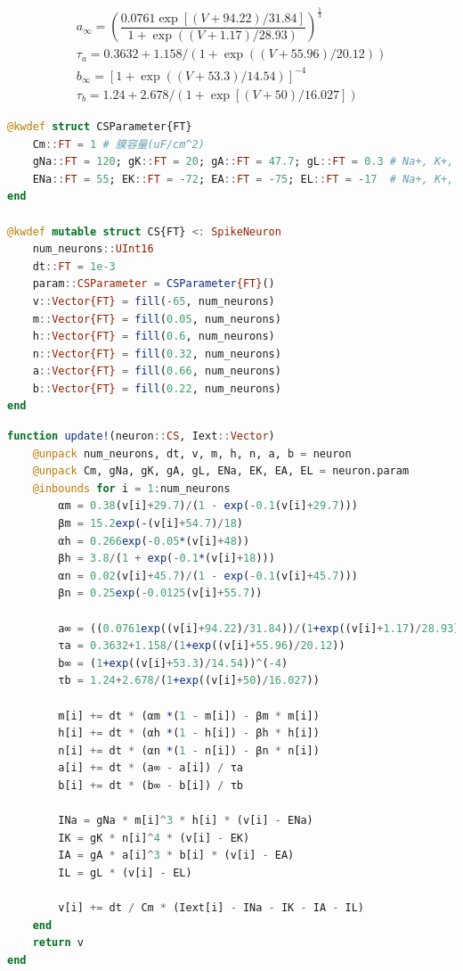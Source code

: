 \begin{equation}
\begin{array}{l}
a_{\infty}=\left(\dfrac{0.0761 \exp [(V+94.22)/31.84]}{1+\exp ((V+1.17)/28.93)}\right)^{\frac{1}{3}}\\
\tau_a=0.3632+1.158 /(1+\exp ((V+55.96)/20.12)) \\
b_{\infty}=\left[1+\exp ((V+53.3)/14.54)\right]^{-4}\\
\tau_b=1.24+2.678 /(1+\exp [(V+50)/16.027])
\end{array}
\end{equation}
\begin{lstlisting}[language=julia]
@kwdef struct CSParameter{FT}
    Cm::FT = 1 # 膜容量(uF/cm^2)
    gNa::FT = 120; gK::FT = 20; gA::FT = 47.7; gL::FT = 0.3 # Na+, K+, KA, leakの最大コンダクタンス(mS/cm^2)
    ENa::FT = 55; EK::FT = -72; EA::FT = -75; EL::FT = -17  # Na+, K+, KA, leakの平衡電位(mV)
end

@kwdef mutable struct CS{FT} <: SpikeNeuron
    num_neurons::UInt16
    dt::FT = 1e-3
    param::CSParameter = CSParameter{FT}()
    v::Vector{FT} = fill(-65, num_neurons)
    m::Vector{FT} = fill(0.05, num_neurons) 
    h::Vector{FT} = fill(0.6, num_neurons)
    n::Vector{FT} = fill(0.32, num_neurons)
    a::Vector{FT} = fill(0.66, num_neurons)
    b::Vector{FT} = fill(0.22, num_neurons)
end
\end{lstlisting}
\begin{lstlisting}[language=julia]
function update!(neuron::CS, Iext::Vector)
    @unpack num_neurons, dt, v, m, h, n, a, b = neuron
    @unpack Cm, gNa, gK, gA, gL, ENa, EK, EA, EL = neuron.param
    @inbounds for i = 1:num_neurons
        αm = 0.38(v[i]+29.7)/(1 - exp(-0.1(v[i]+29.7)))
        βm = 15.2exp(-(v[i]+54.7)/18)
        αh = 0.266exp(-0.05*(v[i]+48))
        βh = 3.8/(1 + exp(-0.1*(v[i]+18)))
        αn = 0.02(v[i]+45.7)/(1 - exp(-0.1(v[i]+45.7)))
        βn = 0.25exp(-0.0125(v[i]+55.7))
        
        a∞ = ((0.0761exp((v[i]+94.22)/31.84))/(1+exp((v[i]+1.17)/28.93)))^(1/3)
        τa = 0.3632+1.158/(1+exp((v[i]+55.96)/20.12))
        b∞ = (1+exp((v[i]+53.3)/14.54))^(-4)
        τb = 1.24+2.678/(1+exp((v[i]+50)/16.027))
        
        m[i] += dt * (αm *(1 - m[i]) - βm * m[i])
        h[i] += dt * (αh *(1 - h[i]) - βh * h[i])
        n[i] += dt * (αn *(1 - n[i]) - βn * n[i])
        a[i] += dt * (a∞ - a[i]) / τa
        b[i] += dt * (b∞ - b[i]) / τb
        
        INa = gNa * m[i]^3 * h[i] * (v[i] - ENa)
        IK = gK * n[i]^4 * (v[i] - EK)
        IA = gA * a[i]^3 * b[i] * (v[i] - EA)
        IL = gL * (v[i] - EL)
        
        v[i] += dt / Cm * (Iext[i] - INa - IK - IA - IL)
    end
    return v
end
\end{lstlisting}
